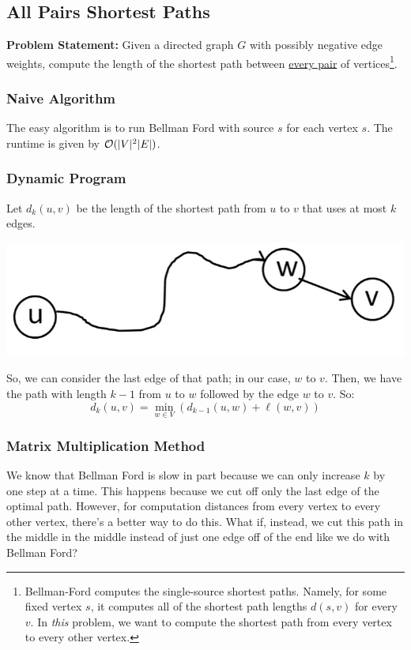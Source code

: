 \documentclass[letterpaper]{article}
\begin{document}
\subsection{All Pairs Shortest Paths}
\textbf{Problem Statement:} Given a directed graph $G$ with possibly negative edge weights, compute the length of the shortest path between \underline{every pair} of vertices\footnote{Bellman-Ford computes the single-source shortest paths. Namely, for some fixed vertex $s$, it computes all of the shortest path lengths $d(s, v)$ for every $v$. In \emph{this} problem, we want to compute the shortest path from every vertex to every other vertex.}.

\subsubsection{Naive Algorithm}
The easy algorithm is to run Bellman Ford with source $s$ for each vertex $s$. The runtime is given by $\mathcal{O}(|V|^2 |E|)$. 

\subsubsection{Dynamic Program}
Let $d_{k}(u, v)$ be the length of the shortest path from $u$ to $v$ that uses at most $k$ edges. 
\begin{center}
    \includegraphics[scale=0.3]{../assets/sp.png}
\end{center}
So, we can consider the last edge of that path; in our case, $w$ to $v$. Then, we have the path with length $k - 1$ from $u$ to $w$ followed by the edge $w$ to $v$. So: 
\[d_{k}(u, v) = \min_{w \in V}(d_{k - 1}(u, w) + \ell(w, v))\]

\subsubsection{Matrix Multiplication Method}
We know that Bellman Ford is slow in part because we can only increase $k$ by one step at a time. This happens because we cut off only the last edge of the optimal path. However, for computation distances from every vertex to every other vertex, there's a better way to do this. What if, instead, we cut this path in the middle in the middle instead of just one edge off of the end like we do with Bellman Ford?
\end{document}
